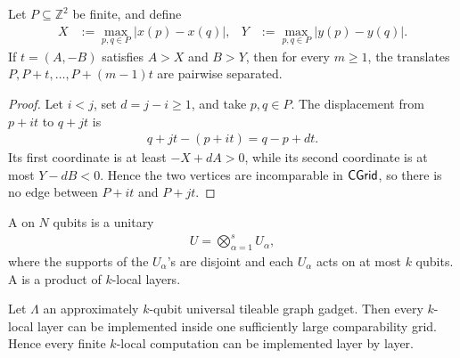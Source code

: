 \begin{example}
\begin{lemma}
\label{lem:anti-diagonal-separation}
Let \(P\subseteq \mathbb Z^2\) be finite, and define
\begin{align}
    X
    &:=
    \max_{p,q\in P}|x(p)-x(q)|,
    &
    Y
    &:=
    \max_{p,q\in P}|y(p)-y(q)|.
\end{align}
If \(t=(A,-B)\) satisfies \(A>X\) and \(B>Y\), then for every \(m\geq 1\),
the translates \(P,P+t,\ldots,P+(m-1)t\) are pairwise separated.
\end{lemma}

\begin{proof}
Let \(i<j\), set \(d=j-i\geq 1\), and take \(p,q\in P\). The displacement
from \(p+it\) to \(q+jt\) is
\begin{align}
    q+jt-(p+it)
    =
    q-p+dt.
\end{align}
Its first coordinate is at least \(-X+dA>0\), while its second coordinate is
at most \(Y-dB<0\). Hence the two vertices are incomparable in \(\mathsf{CGrid}\), so
there is no edge between \(P+it\) and \(P+jt\).
\end{proof}

\begin{definition}
\label{def:k-local-computation}
A  on \(N\) qubits is a unitary
\begin{align}
    U
    =
    \bigotimes_{\alpha=1}^{s}U_\alpha,
\end{align}
where the supports of the \(U_\alpha\)'s are disjoint and each \(U_\alpha\)
acts on at most \(k\) qubits. A  is a product
of \(k\)-local layers.
\end{definition}

\begin{theorem}
\label{thm:k-universal-implies-k-local}
Let \(\Lambda\) an approximately \(k\)-qubit universal tileable graph gadget. Then every
\(k\)-local layer can be implemented inside one sufficiently large
comparability grid. Hence every finite \(k\)-local computation can be
implemented layer by layer.
\end{theorem}


\end{example}
